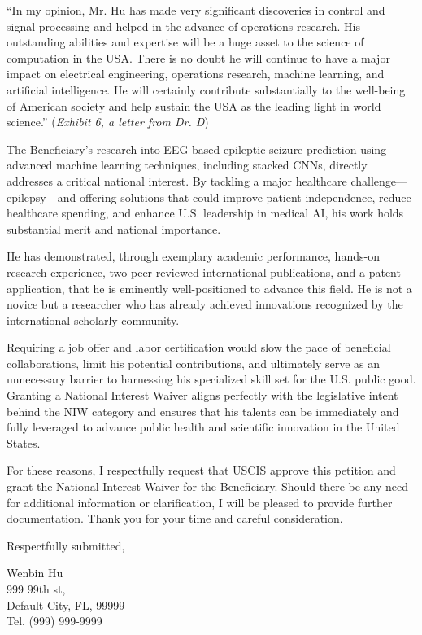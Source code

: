 \documentclass{article}
\begin{document}
“In my opinion, Mr. Hu has made very significant discoveries in control and signal processing and helped in the advance of operations research. His outstanding abilities and expertise will be a huge asset to the science of computation in the USA. There is no doubt he will continue to have a major impact on electrical engineering, operations research, machine learning, and artificial intelligence. He will certainly contribute substantially to the well-being of American society and help sustain the USA as the leading light in world science.” ({\it Exhibit 6, a letter from Dr. D}) 

The Beneficiary’s research into EEG-based epileptic seizure prediction using advanced machine learning techniques, including stacked CNNs, directly addresses a critical national interest. By tackling a major healthcare challenge—epilepsy—and offering solutions that could improve patient independence, reduce healthcare spending, and enhance U.S. leadership in medical AI, his work holds substantial merit and national importance.

He has demonstrated, through exemplary academic performance, hands-on research experience, two peer-reviewed international publications, and a patent application, that he is eminently well-positioned to advance this field. He is not a novice but a researcher who has already achieved innovations recognized by the international scholarly community.

Requiring a job offer and labor certification would slow the pace of beneficial collaborations, limit his potential contributions, and ultimately serve as an unnecessary barrier to harnessing his specialized skill set for the U.S. public good. Granting a National Interest Waiver aligns perfectly with the legislative intent behind the NIW category and ensures that his talents can be immediately and fully leveraged to advance public health and scientific innovation in the United States.

For these reasons, I respectfully request that USCIS approve this petition and grant the National Interest Waiver for the Beneficiary. Should there be any need for additional information or clarification, I will be pleased to provide further documentation.
Thank you for your time and careful consideration.

Respectfully submitted,

\vspace{5\baselineskip}

Wenbin Hu\\
999 99th st,\\
Default City, FL, 99999\\
Tel. (999) 999-9999
\end{document}
